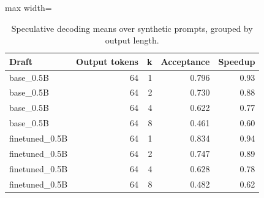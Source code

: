\begin{table}[t]
\centering
\caption{Speculative decoding means over synthetic prompts, grouped by output length.}
\label{tab:speculative}
\begin{adjustbox}{max width=\columnwidth}
\begin{tabular}{lrrrr}
\toprule
Draft & Output tokens & k & Acceptance & Speedup \\
\midrule
base\_0.5B & 64 & 1 & 0.796 & 0.93 \\
base\_0.5B & 64 & 2 & 0.730 & 0.88 \\
base\_0.5B & 64 & 4 & 0.622 & 0.77 \\
base\_0.5B & 64 & 8 & 0.461 & 0.60 \\
finetuned\_0.5B & 64 & 1 & 0.834 & 0.94 \\
finetuned\_0.5B & 64 & 2 & 0.747 & 0.89 \\
finetuned\_0.5B & 64 & 4 & 0.628 & 0.78 \\
finetuned\_0.5B & 64 & 8 & 0.482 & 0.62 \\
\bottomrule
\end{tabular}
\end{adjustbox}
\end{table}
